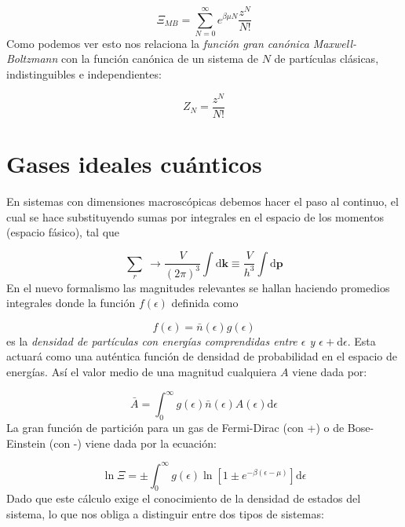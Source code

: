 \documentclass[12pt,a4paper]{article}
\numberwithin{equation}{section}
\numberwithin{figure}{section}
\newcommand{\ccorchetes}[1]{\left[ #1  \right]}
\newcommand{\D}{\mathrm{d}}
\newcommand{\kn}{\mathbf{k}}
\newcommand{\pn}{\mathbf{p}}
\theoremstyle{definition}
\begin{document}
\begin{equation}
\Xi_{MB} = \sum_{N=0}^\infty e^{\beta \mu N} \frac{z^N}{N!}
\end{equation}
Como podemos ver esto nos relaciona la \textit{función gran canónica Maxwell-Boltzmann} con la función canónica de un sistema de $N$ de partículas clásicas, indistinguibles e independientes:

\begin{equation}
Z_N = \frac{z^N }{N!}
\end{equation}


\newpage

\section{Gases ideales cuánticos}

En sistemas con dimensiones macroscópicas debemos hacer el paso al continuo, el cual se hace substituyendo sumas por integrales en el espacio de los momentos (espacio fásico), tal que

\begin{equation}
\sum_r \ \longrightarrow \frac{V}{(2\pi)^3} \int \D \kn  \equiv \frac{V}{h^3} \int \D \pn
\end{equation}
En el nuevo formalismo las magnitudes relevantes se hallan haciendo promedios integrales donde la función  $f(\epsilon)$ definida como

\begin{equation}
f(\epsilon) = \bar{n} (\epsilon) g(\epsilon)
\end{equation}
es la \textit{densidad de partículas con energías comprendidas entre $\epsilon$ y $\epsilon+\D \epsilon$}. Esta actuará como una auténtica función de densidad  de probabilidad en el espacio de energías. Así el valor medio de una magnitud cualquiera $A$ viene dada por:

\begin{equation}
\bar{A} = \int_0^\infty g(\epsilon) \bar{n} (\epsilon) A(\epsilon) \D \epsilon
\end{equation}
La gran función de partición para un gas de Fermi-Dirac (con +) o de Bose-Einstein (con -) viene dada por la ecuación:

\begin{equation}
\ln \Xi = \pm \int_0^{\infty}  g( \epsilon) \ln \ccorchetes{1 \pm e^{-\beta (\epsilon - \mu )}}   \D \epsilon
\end{equation}
Dado que este cálculo exige el conocimiento de la densidad de estados del sistema, lo que nos obliga a distinguir entre dos tipos de sistemas:
\end{document}
